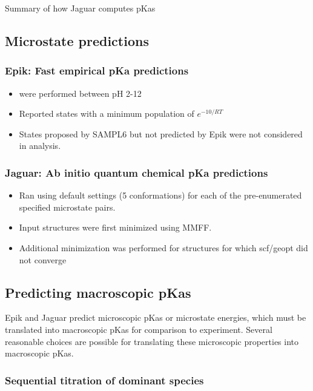 \documentclass[9pt,lineno]{elife}
\begin{document}
Summary of how Jaguar computes pKas  

\subsection{Microstate predictions}

\subsubsection{Epik: Fast empirical pKa predictions}
\begin{itemize}
    \item were performed between pH 2-12
    \item Reported states with a minimum population of $e^{-10/RT}$
    \item States proposed by SAMPL6 but not predicted by Epik were not considered in analysis.

\end{itemize}


\subsubsection{Jaguar: Ab initio quantum chemical pKa predictions}
\begin{itemize}
    \item Ran using default settings (5 conformations) for each of the pre-enumerated specified microstate pairs.
    \item Input structures were first minimized using MMFF.
    \item Additional minimization was performed for structures for which scf/geopt did not converge
\end{itemize}

\subsection{Predicting macroscopic pKas}

Epik and Jaguar predict microscopic pKas or microstate energies, which must be translated into macroscopic pKas for comparison to experiment.
Several reasonable choices are possible for translating these microscopic properties into macroscopic pKas.

\subsubsection{Sequential titration of dominant species} 
\end{document}
